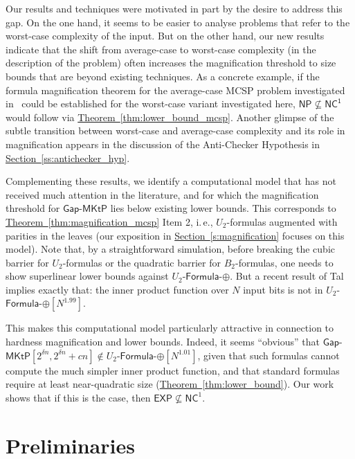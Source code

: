 \documentclass[11pt]{article}
\numberwithin{equation}{section}
\theoremstyle{definition}
\theoremstyle{plain}
\newcommand{\ie}{i.\,e.}
\newcommand{\expref}[2]{\hyperref[#2]{#1~\ref{#2}}}
\newcommand{\gapmktp}{\mathsf{Gap}$-$\mathsf{MKtP}}
\begin{document}
Our results and techniques were motivated in part by the desire to address this gap. On the one hand, it seems to be easier to analyse problems that refer to the worst-case complexity of the input. But on the other hand, our new results indicate that the shift from average-case to worst-case complexity (in the description of the problem) often increases the magnification threshold to size bounds that are beyond existing techniques. As a concrete example, if the formula magnification theorem for the average-case MCSP problem investigated in~\cite{OS18} could be established for the worst-case variant investigated here, $\mathsf{NP \nsubseteq \mathsf{NC}^1}$ would follow via \expref{Theorem}{thm:lower_bound_mcsp}. Another glimpse of the subtle transition between worst-case and average-case complexity and its role in magnification appears in the discussion of the Anti-Checker Hypothesis in \expref{Section}{ss:antichecker_hyp}.

Complementing these results, we identify a computational model that has not received much attention in the literature, and for which the magnification threshold for $\gapmktp$ lies below existing lower bounds. This corresponds to \expref{Theorem}{thm:magnification_mcsp} Item 2, \ie, $U_2$-formulas augmented with parities in the leaves (our exposition in \expref{Section}{s:magnification} focuses on this model). Note that, by a straightforward simulation, before breaking the cubic barrier for $U_2$-formulas or the quadratic barrier for $B_2$-formulas, one needs to show superlinear lower bounds against $U_2$-$\mathsf{Formula}$-$\oplus$. But a recent result of Tal~\cite{DBLP:journals/eccc/Tal16b} implies exactly that: the inner product function over $N$ input bits is not in $U_2$-$\mathsf{Formula}$-$\oplus[N^{1.99}]$.

This makes this computational model particularly attractive in connection to hardness magnification and lower bounds. Indeed, it seems ``obvious'' that $\gapmktp[2^{\delta n}, 2^{\delta n} + cn] \notin U_2$-$\mathsf{Formula}$-$\oplus[N^{1.01}]$, given that such formulas cannot compute the much simpler inner product function, and that standard formulas require at least near-quadratic size (\expref{Theorem}{thm:lower_bound}). Our work shows that if this is the case, then $\mathsf{EXP} \nsubseteq \mathsf{NC}^1$. 


\section{Preliminaries}\label{s:preliminaries}
\end{document}
